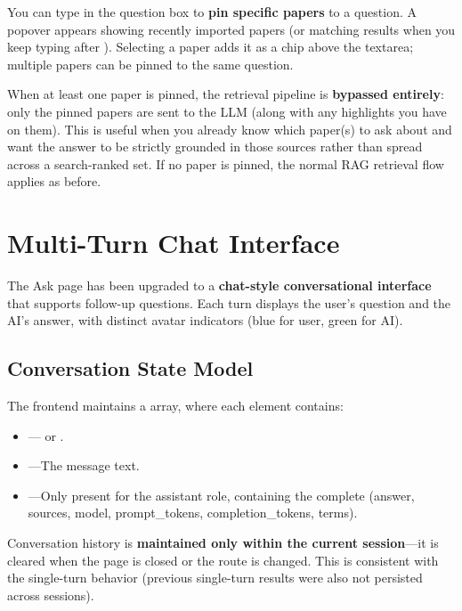 You can type  in the question box to \textbf{pin specific papers} to a question.
A popover appears showing recently imported papers (or matching results when you keep
typing after ). Selecting a paper adds it as a chip above the textarea; multiple
papers can be pinned to the same question.

When at least one paper is pinned, the retrieval pipeline is \textbf{bypassed entirely}:
only the pinned papers are sent to the LLM (along with any highlights you have on them).
This is useful when you already know which paper(s) to ask about and want the answer
to be strictly grounded in those sources rather than spread across a search-ranked set.
If no paper is pinned, the normal RAG retrieval flow applies as before.

\section{Multi-Turn Chat Interface}

The Ask page has been upgraded to a \textbf{chat-style conversational interface} that supports
follow-up questions. Each turn displays the user's question and the AI's answer, with distinct
avatar indicators (blue for user, green for AI).


\subsection{Conversation State Model}

The frontend maintains a  array, where each element contains:

\begin{itemize}
  \item {}--- or .
  \item {}---The message text.
  \item {}---Only present for the assistant role, containing the complete
     (answer, sources, model, prompt\_tokens, completion\_tokens, terms).
\end{itemize}

Conversation history is \textbf{maintained only within the current session}---it is cleared when
the page is closed or the route is changed. This is consistent with the single-turn behavior
(previous single-turn results were also not persisted across sessions).

